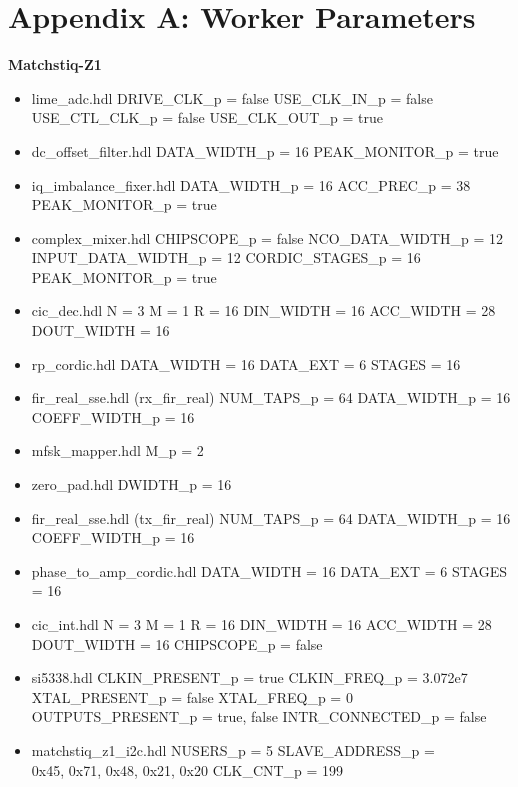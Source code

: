 \section{Appendix A: Worker Parameters}
	\begin{minipage}[t]{.5\textwidth}
		\textbf{Matchstiq-Z1}
	\begin{itemize}
		\item lime\_adc.hdl
			\subitem DRIVE\_CLK\_p = false
			\subitem USE\_CLK\_IN\_p = false
			\subitem USE\_CTL\_CLK\_p = false
			\subitem USE\_CLK\_OUT\_p = true
		\item dc\_offset\_filter.hdl
			\subitem DATA\_WIDTH\_p = 16
			\subitem PEAK\_MONITOR\_p = true
		\item iq\_imbalance\_fixer.hdl
			\subitem DATA\_WIDTH\_p = 16
			\subitem ACC\_PREC\_p = 38
			\subitem PEAK\_MONITOR\_p = true
		\item complex\_mixer.hdl
			\subitem CHIPSCOPE\_p = false
			\subitem NCO\_DATA\_WIDTH\_p = 12
			\subitem INPUT\_DATA\_WIDTH\_p = 12
			\subitem CORDIC\_STAGES\_p = 16
			\subitem PEAK\_MONITOR\_p = true
		\item cic\_dec.hdl
			\subitem N = 3
			\subitem M = 1
			\subitem R = 16
			\subitem DIN\_WIDTH = 16
			\subitem ACC\_WIDTH = 28
			\subitem DOUT\_WIDTH = 16
		\item rp\_cordic.hdl
			\subitem DATA\_WIDTH = 16
			\subitem DATA\_EXT = 6
			\subitem STAGES = 16
		\item fir\_real\_sse.hdl (rx\_fir\_real)
			\subitem NUM\_TAPS\_p = 64
			\subitem DATA\_WIDTH\_p = 16
			\subitem COEFF\_WIDTH\_p = 16
		\item mfsk\_mapper.hdl
			\subitem M\_p = 2
		\item zero\_pad.hdl
			\subitem DWIDTH\_p = 16
	\end{itemize}
	\end{minipage}
	\begin{minipage}[t]{.5\textwidth}
		\textbf{ }
	\begin{itemize}
		\item fir\_real\_sse.hdl (tx\_fir\_real)
			\subitem NUM\_TAPS\_p = 64
			\subitem DATA\_WIDTH\_p = 16
			\subitem COEFF\_WIDTH\_p = 16
		\item phase\_to\_amp\_cordic.hdl
			\subitem DATA\_WIDTH = 16
			\subitem DATA\_EXT = 6
			\subitem STAGES = 16
		\item cic\_int.hdl
			\subitem N = 3
			\subitem M = 1
			\subitem R = 16
			\subitem DIN\_WIDTH = 16
			\subitem ACC\_WIDTH = 28
			\subitem DOUT\_WIDTH = 16
			\subitem CHIPSCOPE\_p = false
		\item si5338.hdl
			\subitem CLKIN\_PRESENT\_p = true
			\subitem CLKIN\_FREQ\_p = 3.072e7
			\subitem XTAL\_PRESENT\_p = false
			\subitem XTAL\_FREQ\_p = 0
			\subitem OUTPUTS\_PRESENT\_p = true, false
			\subitem INTR\_CONNECTED\_p = false
		\item matchstiq\_z1\_i2c.hdl
			\subitem NUSERS\_p = 5
			\subitem SLAVE\_ADDRESS\_p = \\0x45, 0x71, 0x48, 0x21, 0x20
			\subitem CLK\_CNT\_p = 199
	\end{itemize}
	\end{minipage}
